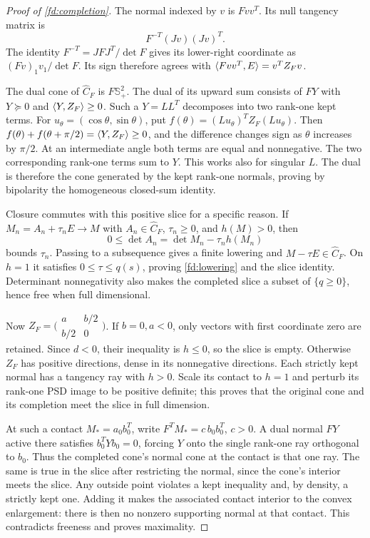 \begin{proof}[Proof of \cref{fd:completion}]
\label{fd:completion-proof}
The normal indexed by $v$ is $Fvv^T$. Its null tangency matrix is
\[
 F^{-T}(Jv)(Jv)^T.
\]
The identity
$F^{-T}=JFJ^T/\det F$ gives its lower-right coordinate as
$(Fv)_1v_1/\det F$. Its sign therefore agrees with
$\langle Fvv^T,E\rangle=v^TZ_Fv$.

The dual cone of $\widehat C_F$ is $F\mathbb S_+^2$.
The dual of its upward sum consists of $FY$ with
$Y\succeq0$ and $\langle Y,Z_F\rangle\ge0$.
Such a $Y=LL^T$ decomposes into two rank-one kept terms.
For $u_\theta=(\cos\theta,\sin\theta)$, put
$f(\theta)=(Lu_\theta)^TZ_F(Lu_\theta)$.
Then $f(\theta)+f(\theta+\pi/2)=\langle Y,Z_F\rangle\ge0$,
and the difference changes sign as $\theta$ increases by
$\pi/2$. At an intermediate angle both terms are equal
and nonnegative. The two corresponding rank-one terms
sum to $Y$. This works also for singular $L$.
The dual is therefore the cone generated by the kept
rank-one normals, proving by bipolarity the homogeneous
closed-sum identity.

Closure commutes with this positive slice for a specific reason.
If $M_n=A_n+\tau_nE\to M$ with $A_n\in\widehat C_F$,
$\tau_n\ge0$, and $h(M)>0$, then
\[
 0\le\det A_n=\det M_n-\tau_n h(M_n)
\]
bounds $\tau_n$. Passing to a subsequence gives a finite
lowering and $M-\tau E\in\widehat C_F$.
On $h=1$ it satisfies $0\le\tau\le q(s)$, proving
\cref{fd:lowering} and the slice identity. Determinant
nonnegativity also makes the completed slice a subset
of $\{q\ge0\}$, hence free when full dimensional.

Now $Z_F=\bigl(\begin{smallmatrix}a&b/2\\b/2&0\end{smallmatrix}\bigr)$.
If $b=0,a<0$, only vectors with first coordinate zero
are retained. Since $d<0$, their inequality is $h\le0$,
so the slice is empty. Otherwise $Z_F$ has positive
directions, dense in its nonnegative directions.
Each strictly kept normal has a tangency ray with $h>0$.
Scale its contact to $h=1$ and perturb its rank-one PSD
image to be positive definite; this proves that the
original cone and its completion meet the slice in
full dimension.

At such a contact $M_*=a_0b_0^T$, write
$F^TM_*=c\,b_0b_0^T$, $c>0$.
A dual normal $FY$ active there satisfies
$b_0^TYb_0=0$, forcing $Y$ onto the single rank-one
ray orthogonal to $b_0$. Thus the completed cone's
normal cone at the contact is that one ray.
The same is true in the slice after restricting the
normal, since the cone's interior meets the slice.
Any outside point violates a kept inequality and, by
density, a strictly kept one. Adding it makes the
associated contact interior to the convex enlargement:
there is then no nonzero supporting normal at that
contact. This contradicts freeness and proves maximality.
\end{proof}

